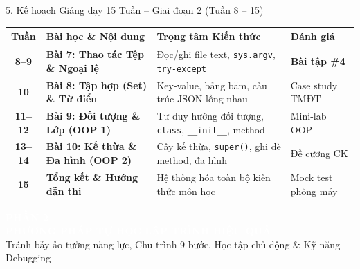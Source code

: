 \documentclass[aspectratio=169, 10pt]{beamer}
\begin{document}
\begin{frame}{5. Kế hoạch Giảng dạy 15 Tuần -- Giai đoạn 2 (Tuần 8 -- 15)}
  \scriptsize
  \begin{tabularx}{\textwidth}{c l X l}
    \toprule
    \textbf{Tuần} & \textbf{Bài học \& Nội dung} & \textbf{Trọng tâm Kiến thức} & \textbf{Đánh giá} \\
    \midrule
    \textbf{8--9} & \textbf{Bài 7: Thao tác Tệp \& Ngoại lệ} & Đọc/ghi file text, \texttt{sys.argv}, \texttt{try-except} & \textbf{Bài tập \#4} \\
    \textbf{10} & \textbf{Bài 8: Tập hợp (Set) \& Từ điển} & Key-value, bảng băm, cấu trúc JSON lồng nhau & Case study TMĐT \\
    \textbf{11--12} & \textbf{Bài 9: Đối tượng \& Lớp (OOP 1)} & Tư duy hướng đối tượng, \texttt{class}, \texttt{\_\_init\_\_}, method & Mini-lab OOP \\
    \textbf{13--14} & \textbf{Bài 10: Kế thừa \& Đa hình (OOP 2)} & Cây kế thừa, \texttt{super()}, ghi đè method, đa hình & Đề cương CK \\
    \textbf{15} & \textbf{Tổng kết \& Hướng dẫn thi} & Hệ thống hóa toàn bộ kiến thức môn học & Mock test phòng máy \\
    \bottomrule
  \end{tabularx}
\end{frame}

\begin{frame}[plain]
  \vfill
  \begin{tcolorbox}[colback=secondarygreen, colframe=secondarygreen, arc=5pt, left=15pt, right=15pt, top=15pt, bottom=15pt]
    \textcolor{white}{\large\textbf{PHẦN 2}}\\[4pt]
    {\LARGE\textbf{\textcolor{white}{PHƯƠNG PHÁP TỰ HỌC LẬP TRÌNH HIỆU QUẢ}}}\\[6pt]
    \textcolor{white!80}{\small Tránh bẫy ảo tưởng năng lực, Chu trình 9 bước, Học tập chủ động \& Kỹ năng Debugging}
  \end{tcolorbox}
  \vfill
\end{frame}
\end{document}
